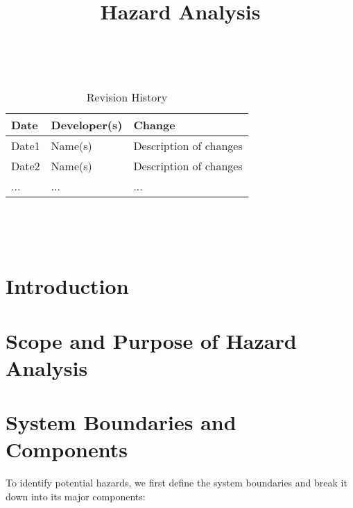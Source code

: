 \documentclass{article}
\title{Hazard Analysis\\\progname}
\author{\authname}
\date{}
\begin{document}
\maketitle
\thispagestyle{empty}

~\newpage


\begin{table}[hp]
\caption{Revision History} \label{TblRevisionHistory}
\begin{tabularx}{\textwidth}{llX}
\toprule
\textbf{Date} & \textbf{Developer(s)} & \textbf{Change}\\
\midrule
Date1 & Name(s) & Description of changes\\
Date2 & Name(s) & Description of changes\\
... & ... & ...\\
\bottomrule
\end{tabularx}
\end{table}

~\newpage

\tableofcontents

~\newpage



\section{Introduction}


\section{Scope and Purpose of Hazard Analysis}


\section{System Boundaries and Components}

To identify potential hazards, we first define the system boundaries and break it down into its major components:
\end{document}
